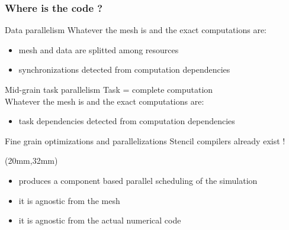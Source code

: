 \documentclass{beamer}
\begin{document}
\begin{frame}[fragile]
\frametitle{Where is the code ?}
\begin{block}{Data parallelism}
Whatever the mesh is and the exact computations are:
\begin{itemize}
\item mesh and data are splitted among resources
\item synchronizations detected from computation dependencies
\end{itemize}
\end{block}

\begin{block}{Mid-grain task parallelism}
Task = complete computation\\
Whatever the mesh is and the exact computations are:
\begin{itemize}
\item task dependencies detected from computation dependencies
\end{itemize}
\end{block}

\begin{alertblock}{Fine grain optimizations and parallelizations}
Stencil compilers already exist !
\end{alertblock}

\begin{textblock*}{0.8\textwidth}(20mm,32mm)
\begin{tcolorbox}[width=\textwidth,title={MSL = computation dependencies}]
  \begin{itemize}  
  \item produces a component based parallel scheduling of the simulation
  \item it is agnostic from the mesh
  \item it is agnostic from the actual numerical code
  \end{itemize}
\end{tcolorbox} 
\end{textblock*}

\end{frame}
\end{document}
